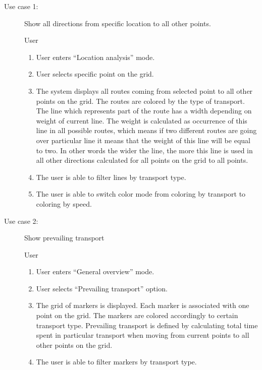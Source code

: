 \begin{description}
  \item[Use case 1:] Show all directions from specific location to all other points.

  \underline{} User

  \underline{}
  \begin{enumerate}
    \item User enters ``Location analysis'' mode.
    \item User selects specific point on the grid.
    \item The system displays all routes coming from selected point to all other points on the
    grid. The routes are colored by the type of transport. The line which represents part
    of the route has a width depending on weight of current line. The weight is calculated
    as occurrence of this line in all possible routes, which means if two different
    routes are going over particular line it means that the weight of this line will
    be equal to two. In other words the wider the line, the more this line is used in all other
    directions calculated for all points on the grid to all points.
    \item The user is able to filter lines by transport type.
    \item The user is able to switch color mode from coloring by transport to
    coloring by speed.
  \end{enumerate}

  \item[Use case 2:] Show prevailing transport

  \underline{} User

  \underline{}
  \begin{enumerate}
    \item User enters ``General overview'' mode.
    \item User selects ``Prevailing transport'' option.
    \item The grid of markers is displayed. Each marker is associated with one
    point on the grid. The markers are colored accordingly to certain transport type. Prevailing
    transport is defined by calculating total time spent in particular transport when
    moving from current points to all other points on the grid.
    \item The user is able to filter markers by transport type.
  \end{enumerate}


\end{description}
